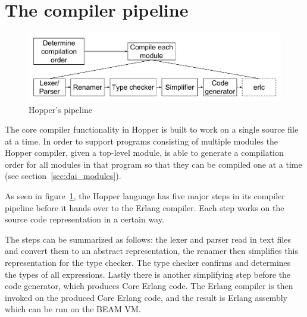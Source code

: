 \section{The compiler pipeline}


\begin{figure}[h!]
\centering
  \includegraphics[width=0.6\pdfpagewidth]{figure/pipeline}
  \caption{Hopper's pipeline}
  \label{fig:pipeline}
\end{figure}

The core compiler functionality in Hopper is built to work on a single source file at a time. In order to support programs consisting of multiple modules the Hopper compiler, given a top-level module, is able to generate a compilation order for all modules in that program so that they can be compiled one at a time (see section~\ref{sec:dai_modules}).

As seen in figure~\ref{fig:pipeline}, the Hopper language has five major steps in its compiler pipeline before it hands over to the Erlang compiler. Each step works on the source code representation in a certain way.

The steps can be summarized as follows: the lexer and parser read in text files and convert them to an abstract representation, the renamer then simplifies this representation for the type checker. The type checker confirms and determines the types of all expressions. Lastly  there is another simplifying step before the code generator, which produces Core Erlang code. The Erlang compiler is then invoked on the produced Core Erlang code, and the result is Erlang assembly which can be run on the BEAM VM.